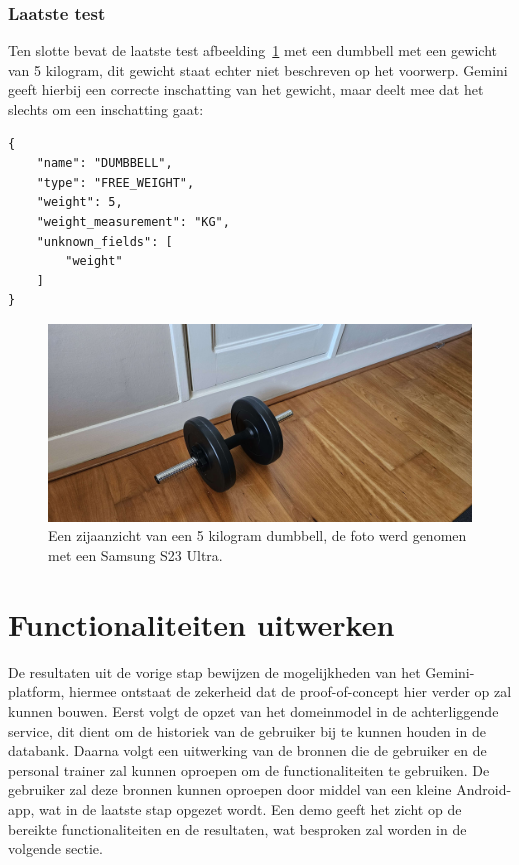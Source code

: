 \subsubsection{Laatste test}
Ten slotte bevat de laatste test afbeelding~\ref{fig:test-drie} met een dumbbell met een gewicht van 5 kilogram, dit gewicht staat echter niet beschreven op het voorwerp.
Gemini geeft hierbij een correcte inschatting van het gewicht, maar deelt mee dat het slechts om een inschatting gaat:
\begin{listing}[H]
    \begin{verbatim}
{
    "name": "DUMBBELL",
    "type": "FREE_WEIGHT",
    "weight": 5,
    "weight_measurement": "KG",
    "unknown_fields": [
        "weight"
    ]
}
    \end{verbatim}
\end{listing}

\begin{figure}[H]
    \begin{center}
        \includegraphics[scale=0.11]{images/prompt3-image}
        \caption{Een zijaanzicht van een 5 kilogram dumbbell, de foto werd genomen met een Samsung S23 Ultra.}
        \label{fig:test-drie}
    \end{center}
\end{figure}

\section{Functionaliteiten uitwerken}
\label{sec:functionaliteiten-uitwerken}
De resultaten uit de vorige stap bewijzen de mogelijkheden van het Gemini-platform, hiermee ontstaat de zekerheid dat de proof-of-concept hier verder op zal kunnen bouwen.
Eerst volgt de opzet van het domeinmodel in de achterliggende service, dit dient om de historiek van de gebruiker bij te kunnen houden in de databank.
Daarna volgt een uitwerking van de bronnen die de gebruiker en de personal trainer zal kunnen oproepen om de functionaliteiten te gebruiken.
De gebruiker zal deze bronnen kunnen oproepen door middel van een kleine Android-app, wat in de laatste stap opgezet wordt.
Een demo geeft het zicht op de bereikte functionaliteiten en de resultaten, wat besproken zal worden in de volgende sectie.

